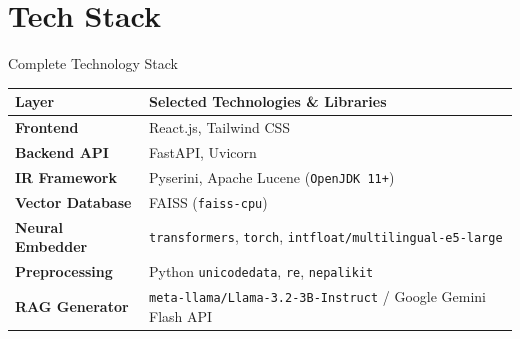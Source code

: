 \documentclass[aspectratio=169]{beamer}
\begin{document}
\section{Tech Stack}
\begin{frame}{Complete Technology Stack}
  \begin{table}
    \centering
    \begin{tabular}{ll}
      \toprule
      \textbf{Layer} & \textbf{Selected Technologies \& Libraries} \\
      \midrule
      \textbf{Frontend} & React.js, Tailwind CSS \\
      \textbf{Backend API} & FastAPI, Uvicorn \\
      \textbf{IR Framework} & Pyserini, Apache Lucene (\texttt{OpenJDK 11+}) \\
      \textbf{Vector Database} & FAISS (\texttt{faiss-cpu}) \\
      \textbf{Neural Embedder} & \texttt{transformers}, \texttt{torch}, \texttt{intfloat/multilingual-e5-large} \\
      \textbf{Preprocessing} & Python \texttt{unicodedata}, \texttt{re}, \texttt{nepalikit} \\
      \textbf{RAG Generator} & \texttt{meta-llama/Llama-3.2-3B-Instruct} / Google Gemini Flash API \\
      \bottomrule
    \end{tabular}
  \end{table}
\end{frame}
\end{document}
